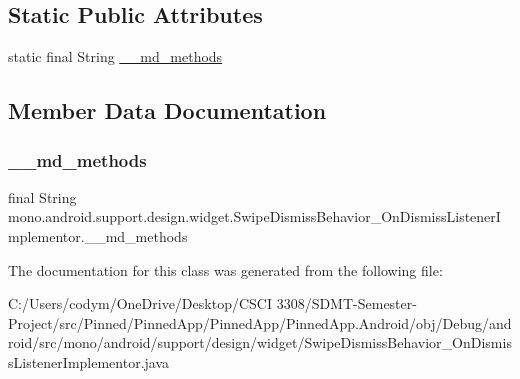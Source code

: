 \subsection*{Static Public Attributes}
\begin{DoxyCompactItemize}
\item 
static final String \hyperlink{classmono_1_1android_1_1support_1_1design_1_1widget_1_1_swipe_dismiss_behavior___on_dismiss_listener_implementor_a74474e8db31efe7e1470f76275367cfe}{\+\_\+\+\_\+md\+\_\+methods}
\end{DoxyCompactItemize}


\subsection{Member Data Documentation}
\mbox{\label{classmono_1_1android_1_1support_1_1design_1_1widget_1_1_swipe_dismiss_behavior___on_dismiss_listener_implementor_a74474e8db31efe7e1470f76275367cfe}} 
\subsubsection{\texorpdfstring{\+\_\+\+\_\+md\+\_\+methods}{\_\_md\_methods}}
{\footnotesize\ttfamily final String mono.\+android.\+support.\+design.\+widget.\+Swipe\+Dismiss\+Behavior\+\_\+\+On\+Dismiss\+Listener\+Implementor.\+\_\+\+\_\+md\+\_\+methods\hspace{0.3cm}{\ttfamily [static]}}



The documentation for this class was generated from the following file\+:\begin{DoxyCompactItemize}
\item 
C\+:/\+Users/codym/\+One\+Drive/\+Desktop/\+C\+S\+C\+I 3308/\+S\+D\+M\+T-\/\+Semester-\/\+Project/src/\+Pinned/\+Pinned\+App/\+Pinned\+App/\+Pinned\+App.\+Android/obj/\+Debug/android/src/mono/android/support/design/widget/Swipe\+Dismiss\+Behavior\+\_\+\+On\+Dismiss\+Listener\+Implementor.\+java\end{DoxyCompactItemize}
